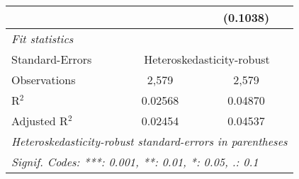 \begin{tabular}{lcc}
                                         &                 & (0.1038)\\   
   \midrule
   \emph{Fit statistics}\\
   Standard-Errors & \multicolumn{2}{c}{Heteroskedasticity-robust} \\ 
   Observations                          & 2,579           & 2,579\\  
   R$^2$                                 & 0.02568         & 0.04870\\  
   Adjusted R$^2$                        & 0.02454         & 0.04537\\  
   \midrule \midrule
   \multicolumn{3}{l}{\emph{Heteroskedasticity-robust standard-errors in parentheses}}\\
   \multicolumn{3}{l}{\emph{Signif. Codes: ***: 0.001, **: 0.01, *: 0.05, .: 0.1}}\\
\end{tabular}
\par\endgroup


